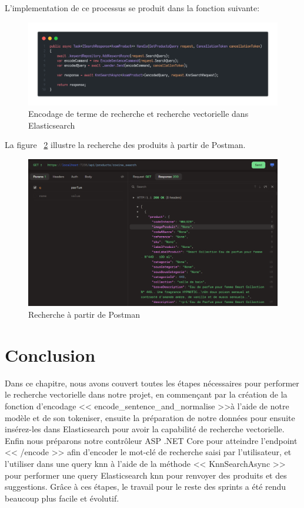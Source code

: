 \noindent
L'implementation de ce processus se produit dans la fonction suivante:

\begin{figure}[H]
	\centering
	\includegraphics[width=1\textwidth]{logos/returnencodedvector.png}
	\caption{Encodage de terme de recherche et recherche vectorielle dans Elasticsearch}
	\label{fig:returnencodedvector}
\end{figure}


\newpage
\noindent
La figure ~\ref{fig:testsearch} illustre la recherche des produits à partir de Postman.

\begin{figure}[H]
	\centering
	\includegraphics[width=1\textwidth]{logos/testsearch.png}
	\caption{Recherche à partir de Postman}
	\label{fig:testsearch}
\end{figure}

\newpage
\section{Conclusion}
\noindent
Dans ce chapitre, nous avons couvert toutes les étapes nécessaires pour performer le recherche vectorielle dans notre projet, en commençant par la création de la fonction d'encodage << encode\_sentence\_and\_normalise >>à l'aide de notre modèle et de son tokeniser, ensuite la préparation de notre données pour ensuite insérez-les dans Elasticsearch pour avoir la capabilité de recherche vectorielle. Enfin nous préparons notre contrôleur ASP .NET Core pour atteindre l'endpoint << /encode >> afin d'encoder le mot-clé de recherche saisi par l'utilisateur, et l'utiliser dans une query knn à l'aide de la méthode << KnnSearchAsync >> pour performer une query Elasticsearch knn pour renvoyer des produits et des suggestions.
Grâce à ces étapes, le travail pour le reste des sprints a été rendu beaucoup plus facile et évolutif.